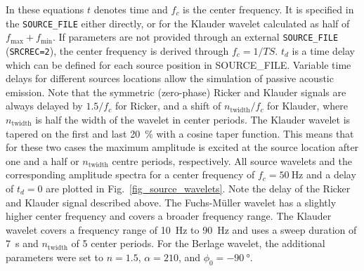In these equations $t$ denotes time and $f_c$ is the center frequency. It is specified in the \texttt{SOURCE\_FILE} either directly, or for the Klauder wavelet calculated as half of $f_\text{max}+f_\text{min}$. If parameters are not provided through an external \texttt{SOURCE\_FILE} (\texttt{SRCREC=2}), the center frequency is derived through $f_c=1/TS$. $t_d$ is a time delay which can be defined for each source position in SOURCE\_FILE. Variable time delays for different sources locations allow the simulation of passive acoustic emission. Note that the symmetric (zero-phase) Ricker and Klauder signals are always delayed by $1.5/f_c$ for Ricker, and a shift of $n_\text{twidth}/f_c$ for Klauder, where $n_\text{twidth}$ is half the width of the wavelet in center periods. The Klauder wavelet is tapered on the first and last \qty{20}{\percent} with a cosine taper function. This means that for these two cases the maximum amplitude is excited at the source location after one and a half or $n_\text{twidth}$ centre periods, respectively. All source wavelets and the corresponding amplitude spectra for a center frequency of $f_c=\qty{50}{\hertz}$ and a delay of $t_d=0$ are plotted in Fig.~\ref{fig_source_wavelets}. Note the delay of the Ricker and Klauder signal described above. The Fuchs-M\"uller wavelet has a slightly higher center frequency and covers a broader frequency range. The Klauder wavelet covers a frequency range of \qty{10}{\hertz} to \qty{90}{\hertz} and uses a sweep duration of \qty{7}{\second} and $n_\text{twidth}$ of 5 center periods. For the Berlage wavelet, the additional parameters were set to $n=1.5$, $\alpha=210$, and $\phi_0=\qty{-90}{\degree}$.

